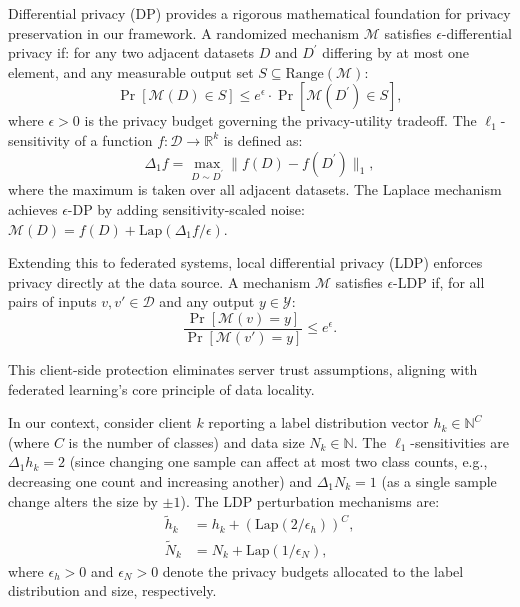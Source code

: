 \documentclass[journal,twoside,web]{ieeecolor}
\begin{document}
Differential privacy (DP) \cite{dp} provides a rigorous mathematical foundation for privacy preservation in our framework. A randomized mechanism \(\mathcal{M}\) satisfies \(\epsilon\)-differential privacy if: for any two adjacent datasets \(D\) and \(D^{\prime}\) differing by at most one element, and any measurable output set \(S \subseteq \text{Range}(\mathcal{M}):\) 
\begin{equation}
\Pr[\mathcal{M}(D) \in S] \leq e^{\epsilon} \cdot \Pr[\mathcal{M}(D^{\prime}) \in S],
\label{eq:dp_def}
\end{equation}
where \(\epsilon > 0\) is the privacy budget governing the privacy-utility tradeoff. The \(\ell_1\)-sensitivity of a function \(f: \mathcal{D} \rightarrow \mathbb{R}^{k}\) is defined as:
\begin{equation}
\Delta_{1} f = \max_{D \sim D^{\prime}} \|f(D) - f(D^{\prime})\|_{1},
\label{eq:sensitivity}
\end{equation}
where the maximum is taken over all adjacent datasets. The Laplace mechanism achieves \(\epsilon\)-DP by adding sensitivity-scaled noise: \(\mathcal{M}(D) = f(D) + \text{Lap}(\Delta_{1} f / \epsilon)\).

Extending this to federated systems, local differential privacy (LDP) \cite{dpprotocols} enforces privacy directly at the data source. A mechanism \(\mathcal{M}\) satisfies \(\epsilon\)-LDP if, for all pairs of inputs \(v, v' \in \mathcal{D}\) and any output \(y \in \mathcal{Y}\):
\begin{equation}
\frac{\Pr[\mathcal{M}(v) = y]}{\Pr[\mathcal{M}(v') = y]} \leq e^{\epsilon}.
\label{eq:ldp_def}
\end{equation}

This client-side protection eliminates server trust assumptions, aligning with federated learning's core principle of data locality.

In our context, consider client \(k\) reporting a label distribution vector \(h_k \in \mathbb{N}^C\) (where \(C\) is the number of classes) and data size \(N_k \in \mathbb{N}\). The \(\ell_1\)-sensitivities are \(\Delta_1 h_k = 2\) (since changing one sample can affect at most two class counts, e.g., decreasing one count and increasing another) and \(\Delta_1 N_k = 1\) (as a single sample change alters the size by \(\pm 1\)). The LDP perturbation mechanisms are:
\begin{align}
\tilde{h}_k &= h_k + \left(\text{Lap}\left(2 / \epsilon_h\right)\right)^C, \label{eq:ldp_label} \\
\tilde{N}_k &= N_k + \text{Lap}\left(1 / \epsilon_N\right), \label{eq:ldp_size}
\end{align}
where \(\epsilon_h > 0\) and \(\epsilon_N > 0\) denote the privacy budgets allocated to the label distribution and size, respectively.
\end{document}
